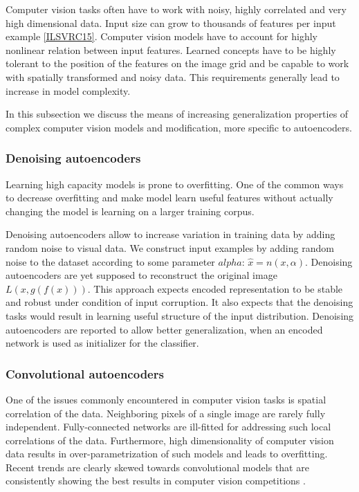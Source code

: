 Computer vision tasks often have to work with noisy, highly correlated and very high dimensional data. Input size can grow to thousands of features per input example \ref{ILSVRC15}.
Computer vision models have to account for highly nonlinear relation between input features.
Learned concepts have to be highly tolerant to the position of the features on the image grid and be capable to work with spatially transformed and noisy data.
This requirements generally lead to increase in model complexity.

In this subsection we discuss the means of increasing generalization properties of complex computer vision models and modification, more specific to autoencoders.

\subsubsection{Denoising autoencoders}\label{ch:denae}

Learning high capacity models is prone to overfitting.
One of the common ways to decrease overfitting and make model learn useful features without actually changing the model is learning on a larger training corpus.

Denoising autoencoders \cite{Vincent2010} allow to increase variation in training data by adding random noise to visual data. We construct input examples by adding random noise to the dataset according to some parameter $alpha$: $\hat{x}=n(x, \alpha)$.
Denoising autoencoders are yet supposed to reconstruct  the original image $L(x, g(f(x)))$.
This approach expects encoded representation to be stable and robust under condition of input corruption.
It also expects that the denoising tasks would result in learning useful structure of the input distribution.
Denoising autoencoders are reported to allow better generalization, when an encoded network is used as initializer for the classifier.

\subsubsection{Convolutional autoencoders}\label{ch:cae}

One of the issues commonly encountered in computer vision tasks is spatial correlation of the data.
Neighboring pixels of a single image are rarely fully independent.
Fully-connected networks are ill-fitted for addressing such local correlations of the data.
Furthermore, high dimensionality of computer vision data results in over-parametrization of such models and leads to overfitting.
Recent trends are clearly skewed towards convolutional models \cite{He2015, Szegedy2016} that are consistently showing the best results in computer vision competitions \cite{ILSVRC15, Zhou2016}.

